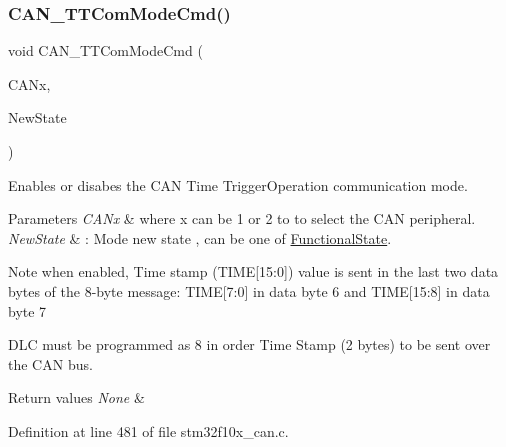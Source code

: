 \subsubsection{\texorpdfstring{C\+A\+N\+\_\+\+T\+T\+Com\+Mode\+Cmd()}{CAN\_TTComModeCmd()}}
{\footnotesize\ttfamily void C\+A\+N\+\_\+\+T\+T\+Com\+Mode\+Cmd (\begin{DoxyParamCaption}\item[{\hyperlink{struct_c_a_n___type_def}{C\+A\+N\+\_\+\+Type\+Def} $\ast$}]{C\+A\+Nx,  }\item[{\hyperlink{group___exported__types_gac9a7e9a35d2513ec15c3b537aaa4fba1}{Functional\+State}}]{New\+State }\end{DoxyParamCaption})}



Enables or disabes the C\+AN Time Trigger\+Operation communication mode. 


\begin{DoxyParams}{Parameters}
{\em C\+A\+Nx} & where x can be 1 or 2 to to select the C\+AN peripheral. \\
\hline
{\em New\+State} & \+: Mode new state , can be one of \hyperlink{group___exported__types_gac9a7e9a35d2513ec15c3b537aaa4fba1}{Functional\+State}. \\
\hline
\end{DoxyParams}
\begin{DoxyNote}{Note}
when enabled, Time stamp (T\+I\+ME\mbox{[}15\+:0\mbox{]}) value is sent in the last two data bytes of the 8-\/byte message\+: T\+I\+ME\mbox{[}7\+:0\mbox{]} in data byte 6 and T\+I\+ME\mbox{[}15\+:8\mbox{]} in data byte 7 

D\+LC must be programmed as 8 in order Time Stamp (2 bytes) to be sent over the C\+AN bus. 
\end{DoxyNote}

\begin{DoxyRetVals}{Return values}
{\em None} & \\
\hline
\end{DoxyRetVals}


Definition at line 481 of file stm32f10x\+\_\+can.\+c.

\mbox{\label{group___c_a_n___private___functions_ga78cdfbf1884b9e33c552bcbca15bed10}} 
